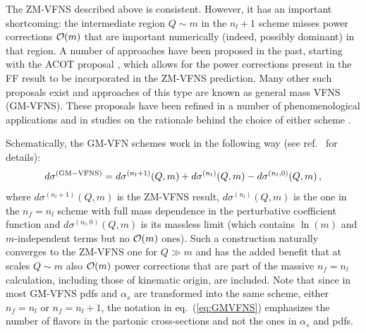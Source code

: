\documentclass[letter,11pt]{article}
\def\as{\alpha_s}
\def\nf{{n_f}}
\def\nl{{n_l}}
\begin{document}
The ZM-VFNS described above is consistent. However, it has an important shortcoming: the intermediate region $Q\sim m$ in the $\nl+1$ scheme misses power corrections ${\cal O}(m)$ that are important numerically (indeed, possibly dominant) in that region. A number of approaches have been proposed in the past, starting with the ACOT proposal \cite{Aivazis:1993pi}, which allows for the power corrections present in the FF result to be incorporated in the ZM-VFNS prediction. Many other such proposals exist \cite{Thorne:1997ga,Thorne:1997uu,Kramer:2000hn,Thorne:2006qt,Tung:2006tb,Nadolsky:2009ge,Forte:2010ta,Guzzi:2011ew,Han:2014nja} and approaches of this type are known as general mass VFNS (GM-VFNS). These proposals have been refined in a number of phenomenological applications \cite{Cacciari:1998it,Forte:2015hba,Forte:2016sja,Olness:1987ep,Olness:1994zn,Bonvini:2015pxa,Bonvini:2016fgf} and in studies on the rationale behind the choice of either scheme \cite{Maltoni:2007tc,Maltoni:2012pa,Degrande:2015vpa,Lim:2016wjo}. 

Schematically, the GM-VFN schemes work in the following way (see ref.~\cite{Forte:2010ta} for details): 
%
\begin{equation}
d\sigma^{\rm (GM-VFNS)} = d\sigma^{(\nl+1)}(Q,m) + d\sigma^{(\nl)}(Q,m) - d\sigma^{(\nl,0)}(Q,m)\,,
\label{eq:GMVFNS}
\end{equation}
%
where $d\sigma^{(\nl+1)}(Q,m)$ is the ZM-VFNS result, $d\sigma^{(\nl)}(Q,m)$ is the one in the $\nf=\nl$ scheme with full mass dependence in the perturbative coefficient function and $d\sigma^{(\nl,0)}(Q,m)$ is its massless limit (which contains $\ln(m)$ and $m$-independent terms but no ${\cal O}(m)$ ones). Such a construction naturally converges to the ZM-VFNS one for $Q\gg m$ and has the added benefit that at scales $Q\sim m$ also ${\cal O}(m)$ power corrections that are part of the massive $\nf=\nl$ calculation{\color{red}, including those of kinematic origin,} are included. Note that since in most GM-VFNS pdfs and $\as$ are transformed into the same scheme, either $\nf=\nl$ or $\nf=\nl+1$, the notation in eq.~(\ref{eq:GMVFNS}) emphasizes the number of flavors in the partonic cross-sections and not the ones in $\as$ and pdfs.
\end{document}
